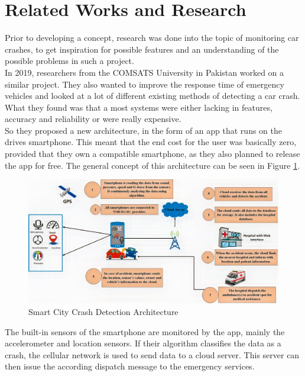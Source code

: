 \section{Related Works and Research}
Prior to developing a concept, 
research was done into the topic of monitoring car crashes,
to get inspiration for possible features 
and an understanding of the possible problems in such a project.
\\
\newline
In 2019, researchers from the COMSATS University in Pakistan\cite{iotAccidentSensNRep} 
worked on a similar project. 
They also wanted to improve the response time of emergency vehicles
and looked at a lot of different existing methods of detecting a car crash.
What they found was that a most systems were either lacking in features,
accuracy and reliability or were really expensive.\cite{iotAccidentSensNRep}
\\
\newline
So they proposed a new architecture, 
in the form of an app that runs on the drives smartphone.
This meant that the end cost for the user was basically zero,
provided that they own a compatible smartphone, 
as they also planned to release the app for free.\cite{iotAccidentSensNRep}
The general concept of this architecture can be seen in Figure \ref{6fig:iotArch}.

\begin{figure}[H]
  \centering\includegraphics[width=\linewidth]{chapters/chapter6_bruno/Figures/bhattiArticleAbb1.png}
  \caption{Smart City Crash Detection Architecture \cite{iotAccidentSensNRep}}
  \label{6fig:iotArch}
\end{figure}

\noindent
The built-in sensors of the smartphone are monitored by the app,
mainly the accelerometer and location sensors.
If their algorithm classifies the data as a crash, 
the cellular network is used to send data to a cloud server.
This server can then issue the according 
dispatch message to the emergency services.

